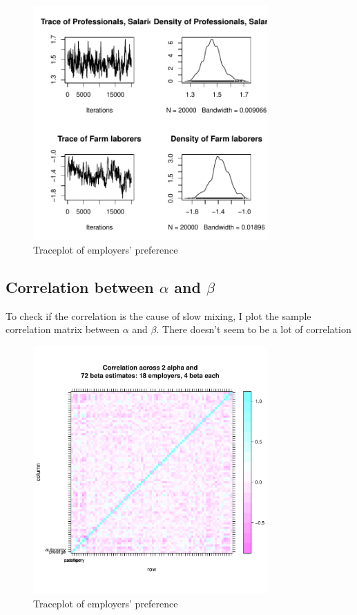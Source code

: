 \documentclass[12pt]{article}
\begin{document}
\begin{figure}[!ht]
\centering
\includegraphics[width=0.8\textwidth]{../figure/trace_beta_adaptive_replicate3}
\caption{Traceplot of employers' preference}
\end{figure}

\subsection{Correlation between $\alpha$ and $\beta$}

To check if the correlation is the cause of slow mixing, I plot the sample
correlation matrix between $\alpha$ and $\beta$. There doesn't seem to be a lot
of correlation

\begin{figure}[!ht]
\centering
\includegraphics[width=0.8\textwidth]{../figure/correlation_across_alphabeta_adaptive}
\caption{Traceplot of employers' preference}
\end{figure}
\end{document}
